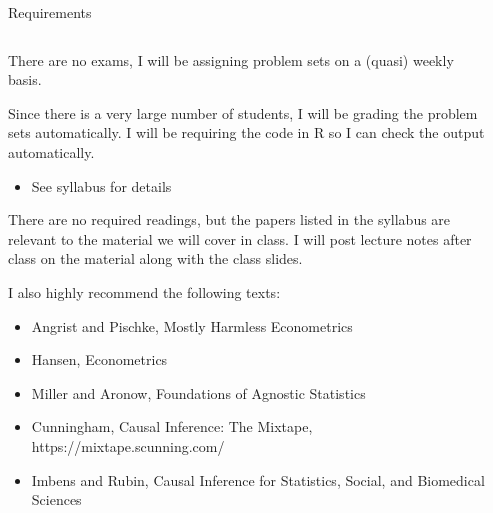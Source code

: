 \documentclass[notes,11pt, aspectratio=169]{beamer}
\newenvironment{wideitemize}{\itemize\addtolength{\itemsep}{10pt}}{\enditemize}
\begin{document}
\begin{frame}{Requirements }
\begin{columns}[T] %
\begin{column}{.9\textwidth}
  \begin{wideitemize}
  \item There are no exams, I will be assigning problem sets on a (quasi) weekly basis.
  \item Since there is a very large number of students, I will be grading the problem sets automatically. I will be requiring the code in R so I can check the output automatically. 
    \begin{itemize}
    \item See syllabus for details
    \end{itemize}
  \item There are no required readings, but the papers listed in the syllabus are relevant to the material we will cover in class. I will post lecture notes after class on the material along with the class slides.
  \item I also highly recommend the following texts:
    \begin{itemize}
    \item Angrist and  Pischke, Mostly Harmless Econometrics
    \item Hansen, Econometrics
    \item Miller and Aronow, Foundations of Agnostic Statistics
    \item Cunningham, Causal Inference: The Mixtape, https://mixtape.scunning.com/
    \item Imbens and Rubin, Causal Inference for Statistics, Social, and Biomedical Sciences      
    \end{itemize}
  \end{wideitemize}
\end{column}%
\hfill%
\begin{column}{.38\textwidth}
  \makebox[\linewidth][c]{
    \resizebox{\linewidth}{!}{
    }
  }
\end{column}%
\end{columns}
\end{frame}
\end{document}
